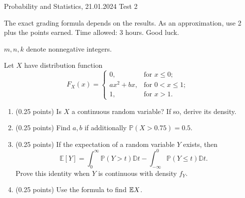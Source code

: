\documentclass[a4paper]{report}
\begin{document}
\noindent Probability and Statistics, 21.01.2024 \hfill Test 2

\hrulefill

\renewcommand{\P}{\mathbb{P}}
\renewcommand{\D}{\mathbb{D}}

\begin{it}
The exact grading formula depends on the results. As an approximation, use 2 plus the points earned. Time allowed: 3 hours. Good luck.

$m,n,k$ denote nonnegative integers.



\end{it}

\begin{problem}
    Let $X$ have distribution function
\[
F_X(x) = \begin{cases}
    0, & \text{for }x\leq0;\\
    ax^2+bx, & \text{for }0<x\leq1;\\
    1, & \text{for }x>1.
\end{cases}
\]
    \begin{enumerate}
        \item (0.25 points) Is $X$ a continuous random variable? If so, derive its density.
        \item (0.25 points) Find $a,b$ if additionally $\P(X>0.75)=0.5$.
        \item (0.25 points) If the expectation of a random variable $Y$ exists, then
        \[\mathbb{E}[Y]=\int_0^\infty\mathbb{P}(Y>t)\D t-\int_{-\infty}^0\mathbb{P}(Y\leq t)\D t.\]
        Prove this identity when $Y$ is continuous with density $f_Y$.
        \item (0.25 points) Use the formula to find $\mathbb {E} X$.
    \end{enumerate}
\end{problem}
\end{document}
